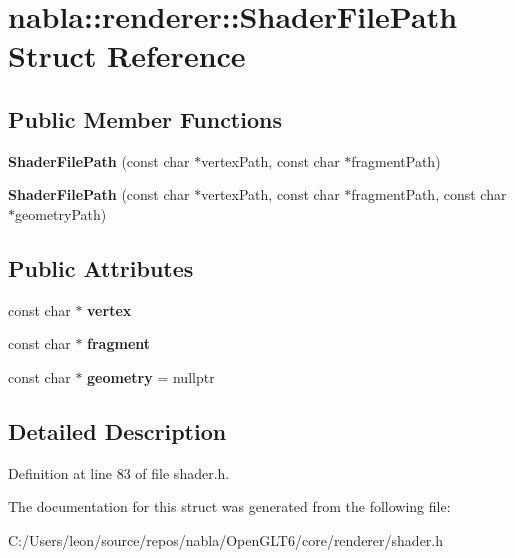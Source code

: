 \hypertarget{structnabla_1_1renderer_1_1_shader_file_path}{}\section{nabla\+::renderer\+::Shader\+File\+Path Struct Reference}
\label{structnabla_1_1renderer_1_1_shader_file_path}
\subsection*{Public Member Functions}
\begin{DoxyCompactItemize}
\item 
\mbox{\label{structnabla_1_1renderer_1_1_shader_file_path_aaff5e42b66bce0756f667cc73e76a17e}} 
{\bfseries Shader\+File\+Path} (const char $\ast$vertex\+Path, const char $\ast$fragment\+Path)
\item 
\mbox{\label{structnabla_1_1renderer_1_1_shader_file_path_a990c8103bd59d143a7ef1be3f40ad195}} 
{\bfseries Shader\+File\+Path} (const char $\ast$vertex\+Path, const char $\ast$fragment\+Path, const char $\ast$geometry\+Path)
\end{DoxyCompactItemize}
\subsection*{Public Attributes}
\begin{DoxyCompactItemize}
\item 
\mbox{\label{structnabla_1_1renderer_1_1_shader_file_path_a9a7053dd0fc85e81a2e371849950c86c}} 
const char $\ast$ {\bfseries vertex}
\item 
\mbox{\label{structnabla_1_1renderer_1_1_shader_file_path_a677908c4b2b59f568be9675844d577ef}} 
const char $\ast$ {\bfseries fragment}
\item 
\mbox{\label{structnabla_1_1renderer_1_1_shader_file_path_a7ac8e9be2a7ad03900163844d19c37a3}} 
const char $\ast$ {\bfseries geometry} = nullptr
\end{DoxyCompactItemize}


\subsection{Detailed Description}


Definition at line 83 of file shader.\+h.



The documentation for this struct was generated from the following file\+:\begin{DoxyCompactItemize}
\item 
C\+:/\+Users/leon/source/repos/nabla/\+Open\+G\+L\+T6/core/renderer/shader.\+h\end{DoxyCompactItemize}
